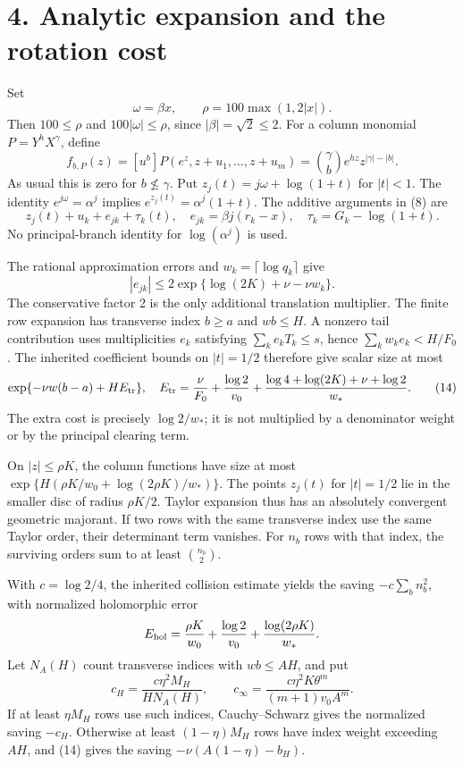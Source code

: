 \documentclass[11pt]{article}
\begin{document}
\section{4. Analytic expansion and the rotation
cost}\label{analytic-expansion-and-the-rotation-cost}

Set \[
\omega=\beta x,\qquad \rho=100\max(1,2|x|).
\] Then \(100\le\rho\) and \(100|\omega|\le\rho\), since
\(|\beta|=\sqrt2\le2\). For a column monomial \(P=Y^hX^\gamma\), define
\[
f_{b,P}(z)=[u^b]P(e^z,z+u_1,\ldots,z+u_m)
=\binom\gamma b e^{hz}z^{|\gamma|-|b|}.
\] As usual this is zero for \(b\not\le\gamma\). Put
\(z_j(t)=j\omega+\log(1+t)\) for \(|t|<1\). The identity
\(e^{j\omega}=\alpha^j\) implies \(e^{z_j(t)}=\alpha^j(1+t)\). The
additive arguments in (8) are \[
z_j(t)+u_k+e_{jk}+\tau_k(t),\quad
e_{jk}=\beta j(r_k-x),\quad \tau_k=G_k-\log(1+t).
\tag{13}
\] No principal-branch identity for \(\log(\alpha^j)\) is used.

The rational approximation errors and \(w_k=\lceil\log q_k\rceil\) give
\[
|e_{jk}|\le2\exp\{\log(2K)+\nu-\nu w_k\}.
\] The conservative factor 2 is the only additional translation
multiplier. The finite row expansion has transverse index \(b\ge a\) and
\(wb\le H\). A nonzero tail contribution uses multiplicities \(e_k\)
satisfying \(\sum_ke_kT_k\le s\), hence \(\sum_kw_ke_k<H/F_0\). The
inherited coefficient bounds on \(|t|=1/2\) therefore give scalar size
at most \[
\exp\{-\nu w(b-a)+HE_{\rm tr}\},
\quad
E_{\rm tr}=\frac\nu{F_0}+\frac{\log2}{v_0}
+\frac{\log4+\log(2K)+\nu+\log2}{w_*}.
\tag{14}
\] The extra cost is precisely \(\log2/w_*\); it is not multiplied by a
denominator weight or by the principal clearing term.

On \(|z|\le\rho K\), the column functions have size at most
\(\exp\{H(\rho K/w_0+\log(2\rho K)/w_*)\}\). The points \(z_j(t)\) for
\(|t|=1/2\) lie in the smaller disc of radius \(\rho K/2\). Taylor
expansion thus has an absolutely convergent geometric majorant. If two
rows with the same transverse index use the same Taylor order, their
determinant term vanishes. For \(n_b\) rows with that index, the
surviving orders sum to at least \(\binom{n_b}2\).

With \(c=\log2/4\), the inherited collision estimate yields the saving
\(-c\sum_bn_b^2\), with normalized holomorphic error \[
E_{\rm hol}=\frac{\rho K}{w_0}+\frac{\log2}{v_0}
+\frac{\log(2\rho K)}{w_*}.
\] Let \(N_A(H)\) count transverse indices with \(wb\le AH\), and put \[
c_H=\frac{c\eta^2M_H}{H N_A(H)},\qquad
c_\infty=\frac{c\eta^2K\theta^m}{(m+1)v_0 A^m}.
\] If at least \(\eta M_H\) rows use such indices, Cauchy--Schwarz gives
the normalized saving \(-c_H\). Otherwise at least \((1-\eta)M_H\) rows
have index weight exceeding \(AH\), and (14) gives the saving
\(-\nu(A(1-\eta)-b_H)\).
\end{document}

